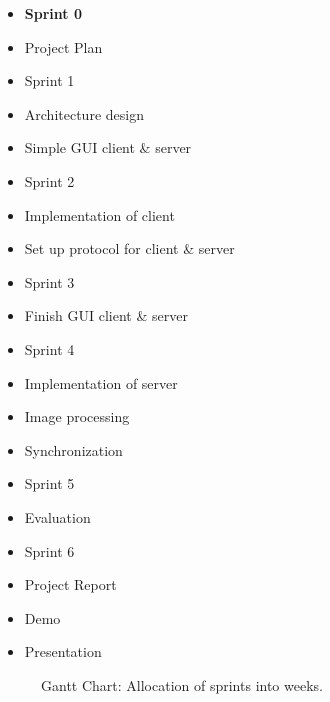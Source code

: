 \documentclass{article}
\begin{document}
\begin{itemize}
    \item \textbf{Sprint 0}
    \item Project Plan
    \item Sprint 1
    \item Architecture design
    \item Simple GUI client \& server
    \item Sprint 2
    \item Implementation of client
    \item Set up protocol for client \& server
    \item Sprint 3
    \item Finish GUI client \& server
    \item Sprint 4
    \item Implementation of server
        \item Image processing
        \item Synchronization
    \item Sprint 5
    \item Evaluation
    \item Sprint 6
    \item Project Report
    \item Demo
    \item Presentation
\end{itemize}

\begin{figure}
\begin{center}
\label{fig:gantt}
\caption{Gantt Chart: Allocation of sprints into weeks.}
\begin{sideways}
\begin{gantt}{8}{14}
    \begin{ganttitle}
    \end{ganttitle}
\end{gantt}
\end{sideways}
\end{center}
\end{figure}
\end{document}
